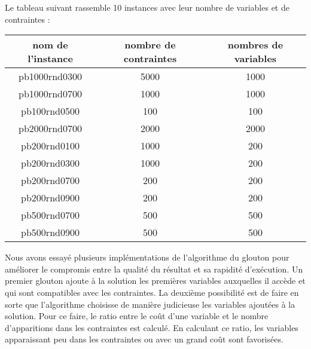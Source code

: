 \noindent
Le tableau suivant rassemble 10 instances avec leur nombre de variables et de contraintes :

\begin{center}
    \begin{tabular}{|c|c|c|}
    \hline
     nom de l'instance & nombre de contraintes & nombres de variables\\
     \hline
     pb1000rnd0300 & 5000 & 1000  \\
     \hline
     pb1000rnd0700 & 1000 & 1000\\
     \hline
     pb100rnd0500 & 100 & 100\\
     \hline
     pb2000rnd0700 & 2000 & 2000\\
     \hline
     pb200rnd0100 & 1000 & 200\\
     \hline 
     pb200rnd0300 & 1000 & 200\\
     \hline
     pb200rnd0700 & 200 & 200\\
     \hline
     pb200rnd0900 & 200 & 200\\
     \hline 
     pb500rnd0700 & 500 & 500\\
     \hline 
     pb500rnd0900 & 500 & 500\\
     \hline
    \end{tabular}
\end{center}

%
%

\vspace{5mm}
\noindent
{}
\vspace{2mm}


Nous avons essayé plusieurs implémentations de l'algorithme du glouton pour améliorer le compromis entre la qualité du résultat et sa rapidité d'exécution. Un premier glouton ajoute à la solution les premières variables auxquelles il accède et qui sont compatibles avec les contraintes. La deuxième possibilité est de faire en sorte que l'algorithme choisisse de manière judicieuse les variables ajoutées à la solution. Pour ce faire, le ratio entre le coût d'une variable et le nombre d'apparitions dans les contraintes est calculé. En calculant ce ratio, les variables apparaissant peu dans les contraintes ou avec un grand coût sont favorisées.

